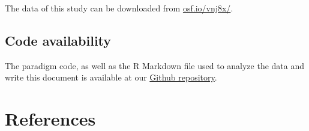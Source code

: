 \documentclass[
  english,
  man,floatsintext]{apa6}
\begin{document}
The data of this study can be downloaded from \href{https://osf.io/vnj8x/}{osf.io/vnj8x/}.

\hypertarget{code-availability}{%
\subsection{Code availability}\label{code-availability}}

The paradigm code, as well as the R Markdown file used to analyze the data and write this document is available at our \href{https://github.com/ChScheffel/CERED}{Github repository}.

\hypertarget{references}{%
\section{References}\label{references}}

\begingroup
\setlength{\parindent}{-0.5in}
\setlength{\leftskip}{0.5in}
\end{document}
